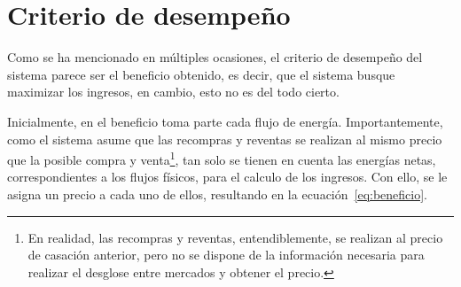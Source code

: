 \section{Criterio de desempeño}%
\label{makereference5.3}

Como se ha mencionado en múltiples ocasiones, el criterio de desempeño del sistema parece ser el beneficio obtenido, es decir, que el sistema busque maximizar los ingresos, en cambio, esto no es del todo cierto.

Inicialmente, en el beneficio toma parte cada flujo de energía. Importantemente, como el sistema asume que las recompras y reventas se realizan al mismo precio que la posible compra y venta\footnote{En realidad, las recompras y reventas, entendiblemente, se realizan al precio de casación anterior, pero no se dispone de la información necesaria para realizar el desglose entre mercados y obtener el precio.}, tan solo se tienen en cuenta las energías netas, correspondientes a los flujos físicos, para el calculo de los ingresos. Con ello, se le asigna un precio a cada uno de ellos, resultando en la ecuación~\ref{eq:beneficio}.

